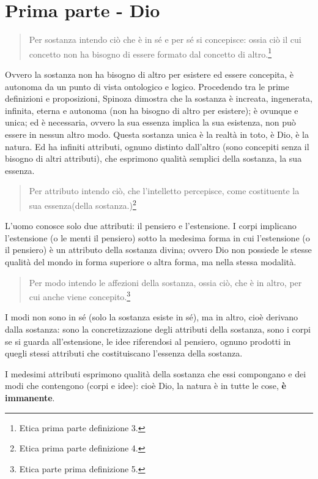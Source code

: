\section{Prima parte - Dio}
\begin{quotation}
\small	Per sostanza intendo ciò che è in sé e per sé si concepisce: ossia ciò il cui concetto non ha bisogno di essere formato dal concetto di altro.\footnote{Etica prima parte definizione 3.}
\end{quotation}
Ovvero la sostanza non ha bisogno di altro per esistere ed essere concepita, è autonoma da un punto di vista ontologico e logico. Procedendo tra le prime definizioni e proposizioni, Spinoza dimostra che la sostanza è increata, ingenerata, infinita, eterna e autonoma (non ha bisogno di altro per esistere); è ovunque e unica; ed è necessaria, ovvero la sua essenza implica la sua esistenza, non può essere in nessun altro modo.
Questa sostanza unica è la realtà in toto, è Dio, è la natura. 
Ed ha infiniti attributi, ognuno distinto dall'altro (sono concepiti senza il bisogno di altri attributi), che esprimono qualità semplici della sostanza, la sua essenza.
\begin{quotation}
	\small Per attributo intendo ciò, che l'intelletto percepisce, come costituente la sua essenza(della sostanza.)\footnote{Etica prima parte definizione 4.}
\end{quotation}
L'uomo conosce solo due attributi: il pensiero e l'estensione. I corpi implicano l'estensione (o le menti il pensiero) sotto la medesima forma in cui l'estensione (o il pensiero) è un attributo della sostanza divina; ovvero Dio non possiede le stesse qualità del mondo in forma superiore o altra forma, ma nella stessa modalità.
\begin{quotation}
	\small Per modo intendo le affezioni della sostanza, ossia ciò, che è in altro, per cui anche viene concepito.\footnote{Etica parte prima definizione 5.}
\end{quotation}
I modi non sono in sé (solo la sostanza esiste in sé), ma in altro, cioè derivano dalla sostanza: sono la concretizzazione degli attributi della sostanza, sono i corpi se si guarda all'estensione, le idee riferendosi al pensiero, ognuno prodotti in quegli stessi attributi che costituiscano l'essenza della sostanza.

I medesimi attributi esprimono qualità della sostanza che essi compongano e dei modi che contengono (corpi e idee): cioè Dio, la natura è in tutte le cose, \textbf{è immanente}.

